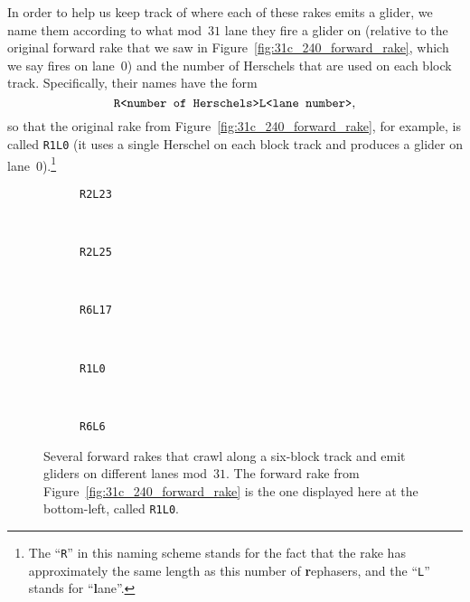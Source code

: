 In order to help us keep track of where each of these rakes emits a glider, we name them according to what mod~$31$ lane they fire a glider on (relative to the original forward rake that we saw in Figure~\ref{fig:31c_240_forward_rake}, which we say fires on lane~$0$) and the number of Herschels that are used on each block track. Specifically, their names have the form
\[
\text{\texttt{R<number of Herschels>L<lane number>}},
\]
so that the original rake from Figure~\ref{fig:31c_240_forward_rake}, for example, is called \texttt{R1L0} (it uses a single Herschel on each block track and produces a glider on lane~0).\footnote{The ``\texttt{R}'' in this naming scheme stands for the fact that the rake has approximately the same length as this number of \textbf{r}ephasers, and the ``\texttt{L}'' stands for ``\textbf{l}ane''.}

\begin{figure}[!htb]
	\centering
	\begin{minipage}{0.3\textwidth}
		\begin{subfigure}{\linewidth}
			\centering
			\caption{\texttt{R2L23}}\label{fig:R2L23}
		\end{subfigure} \\[0.1cm] \begin{subfigure}{\linewidth}
			\centering
			\caption{\texttt{R2L25}}\label{fig:R2L25}
		\end{subfigure}
	\end{minipage} \ \ \ \begin{subfigure}{0.66\textwidth}
		\centering
		\caption{\texttt{R6L17}}\label{fig:R6L17}
	\end{subfigure} \\[0.1cm]
	\begin{subfigure}{0.3\textwidth}
		\centering
		\caption{\texttt{R1L0}}\label{fig:R1L0}
	\end{subfigure} \ \ \ \begin{subfigure}{0.66\textwidth}
		\centering
		\caption{\texttt{R6L6}}\label{fig:R6L6}
	\end{subfigure}
	\caption{Several forward rakes that crawl along a six-block track and emit gliders on different lanes mod~$31$. The forward rake from Figure~\ref{fig:31c_240_forward_rake} is the one displayed here at the bottom-left, called \texttt{R1L0}.}\label{fig:31c_240_forerakes}
\end{figure}

